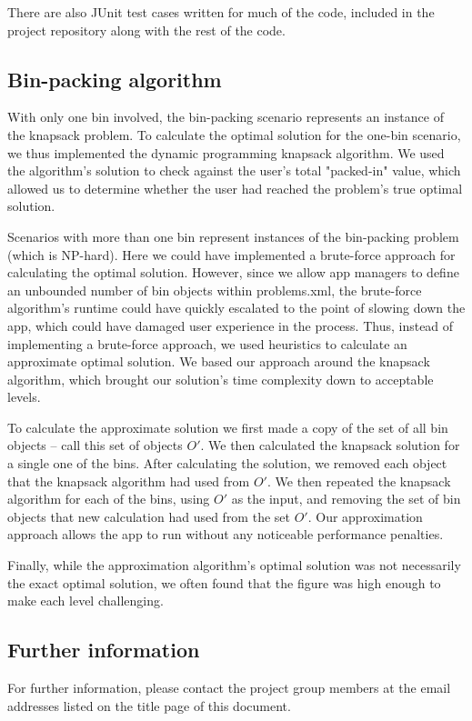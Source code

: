 \documentclass[11pt]{article}
\begin{document}
There are also JUnit test cases written for much of the code, included
in the project repository along with the rest of the code.

\subsection{Bin-packing algorithm}

With only one bin involved, the bin-packing scenario represents an instance of
the knapsack problem. To calculate the optimal solution for the one-bin
scenario, we thus implemented the dynamic programming knapsack algorithm. We
used the algorithm's solution to check against the user's total "packed-in"
value, which allowed us to determine whether the user had reached the problem's
true optimal solution.

Scenarios with more than one bin represent instances of the bin-packing problem
(which is NP-hard). Here we could have implemented a brute-force approach for
calculating the optimal solution. However, since we allow app managers to define
an unbounded number of bin objects within problems.xml, the brute-force
algorithm's runtime could have quickly escalated to the point of slowing down
the app, which could have damaged user experience in the process. Thus, instead
of implementing a brute-force approach, we used heuristics to calculate an
approximate optimal solution. We based our approach around the knapsack
algorithm, which brought our solution's time complexity down to acceptable
levels.

To calculate the approximate solution we first made a copy of the set of all bin
objects -- call this set of objects $O'$. We then calculated the knapsack
solution for a single one of the bins. After calculating the solution, we
removed each object that the knapsack algorithm had used from $O'$. We then
repeated the knapsack algorithm for each of the bins, using $O'$ as the input,
and removing the set of bin objects that new calculation had used from the set
$O'$. Our approximation approach allows the app to run without any noticeable
performance penalties.

Finally, while the approximation algorithm's optimal solution was not
necessarily the exact optimal solution, we often found that the figure was high
enough to make each level challenging.

\subsection{Further information}

For further information, please contact the project group members at the email
addresses listed on the title page of this document.
\end{document}
